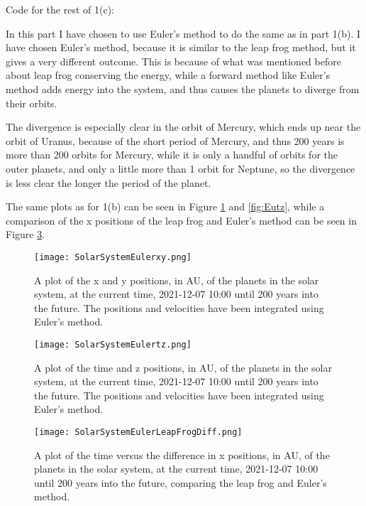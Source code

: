 Code for the rest of 1(c):


In this part I have chosen to use Euler's method to do the same as in part 1(b).
I have chosen Euler's method, because it is similar to the leap frog method, but it gives a very different outcome.
This is because of what was mentioned before about leap frog conserving the energy, while a forward method like Euler's method adds energy into the system, and thus causes the planets to diverge from their orbits.

The divergence is especially clear in the orbit of Mercury, which ends up near the orbit of Uranus, because of the short period of Mercury, and thus 200 years is more than 200 orbits for Mercury, while it is only a handful of orbits for the outer planets, and only a little more than 1 orbit for Neptune, so the divergence is less clear the longer the period of the planet.

The same plots as for 1(b) can be seen in Figure \ref{fig:Euxy} and \ref{fig:Eutz}, while a comparison of the x positions of the leap frog and Euler's method can be seen in Figure \ref{fig:LFEdiff}.

\begin{figure}[ht!]
  \centering
  \texttt{[image: SolarSystemEulerxy.png]}
  \caption{A plot of the x and y positions, in AU, of the planets in the solar system, at the current time, 2021-12-07 10:00 until 200 years into the future. The positions and velocities have been integrated using Euler's method.}
  \label{fig:Euxy}
\end{figure}

\begin{figure}[ht!]
  \centering
  \texttt{[image: SolarSystemEulertz.png]}
  \caption{A plot of the time and z positions, in AU, of the planets in the solar system, at the current time, 2021-12-07 10:00 until 200 years into the future. The positions and velocities have been integrated using Euler's method.}
  \label{fig:Euxz}
\end{figure}

\begin{figure}[ht!]
  \centering
  \texttt{[image: SolarSystemEulerLeapFrogDiff.png]}
  \caption{A plot of the time versus the difference in x positions, in AU, of the planets in the solar system, at the current time, 2021-12-07 10:00 until 200 years into the future, comparing the leap frog and Euler's method.}
  \label{fig:LFEdiff}
\end{figure}







